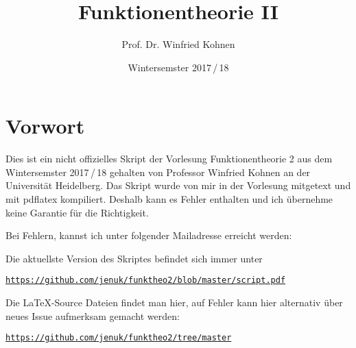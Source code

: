 \documentclass[parskip=half]{scrbook}
\title{Funktionentheorie II}
\author{Prof. Dr. Winfried Kohnen}
\date{Wintersemster 2017\,/\,18}
\begin{document}
\pagestyle{plain}

\maketitle

\chapter*{Vorwort}

Dies ist ein nicht offizielles Skript der Vorlesung Funktionentheorie 2 aus dem Wintersemster 2017\,/\,18 gehalten von Professor Winfried Kohnen an der Universität Heidelberg.
Das Skript wurde von mir in der Vorlesung mitgetext und mit pdflatex kompiliert.
Deshalb kann es Fehler enthalten und ich übernehme keine Garantie für die Richtigkeit.

Bei Fehlern, kannst ich unter folgender Mailadresse erreicht werden:

\begin{center}
\end{center}

Die aktuellste Version des Skriptes befindet sich immer unter
\begin{center}
\texttt{\url{https://github.com/jenuk/funktheo2/blob/master/script.pdf}}
\end{center}

Die \LaTeX-Source Dateien findet man hier, auf Fehler kann hier alternativ über neues Issue aufmerksam gemacht werden:
\begin{center}
\texttt{\url{https://github.com/jenuk/funktheo2/tree/master}}
\end{center}

\clearpage
{}
{}
\tableofcontents

\clearpage
{}
\setcounter{page}{0}
\pagestyle{fancy}











\printindex

\cleardoublepage
{}
{}
\listoftheorems[ignoreall, onlynamed={satz,satz-list,satz-noind,satz-ind}]
\end{document}
